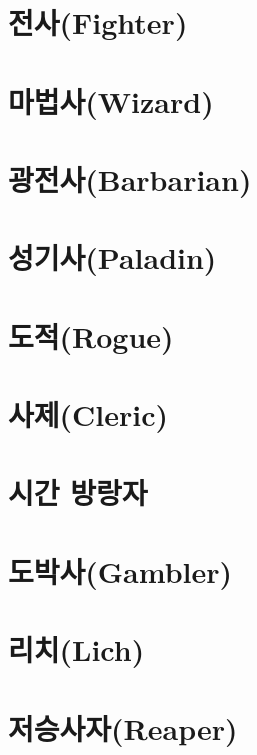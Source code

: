 \documentclass{report}
\begin{document}
	\section{전사(Fighter)}
		
	
	\hypertarget{class:wizard}{}
	\section{마법사(Wizard)}
		
	
	\section{광전사(Barbarian)}
		
	
	\hypertarget{class:paladin}{}
	\section{성기사(Paladin)}
		
	
	\section{도적(Rogue)}
		
	
	\hypertarget{class:cleric}{}
	\section{사제(Cleric)}
		
	
	\section{시간 방랑자}
		
		
	\section{도박사(Gambler)}
		
	
	\section{리치(Lich)}
		
	
	\section{저승사자(Reaper)}
		
\end{document}
